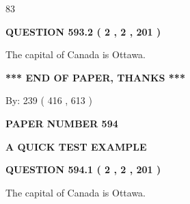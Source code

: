 \documentclass[12pt]{article}
\begin{document}
83
 
 
  
\vspace{0.2in}
  
{\textbf{\Large{QUESTION
593.2 
 ( 2 , 2 , 201 )
}}}
  
  
 
 
\noindent{}
 
 
The capital of Canada is Ottawa.
 
 
 
 
   
   
 \vspace{0.2in}
 
   
   
   
   
\vspace{1.0in} 
{\textbf{\large{ *** END OF PAPER, THANKS *** }}} 
   
   
\hspace{1.0in} By: 
 239 ( 416 ,  613 )
   
   
   
   
\newpage 
\setcounter{page}{ 
   594001 } 
   
   
   
   
 {\textbf{ \Large{ PAPER NUMBER  594  }}}
   
   
\vspace{0.2in}
   
   
   
   
   
   
 \vspace{0.2in}
{\LARGE {\textbf{ A QUICK TEST EXAMPLE}}}
   
   
  
\vspace{0.2in}
  
{\textbf{\Large{QUESTION
594.1 
 ( 2 , 2 , 201 )
}}}
  
  
 
 
\noindent{}
 
 
The capital of Canada is Ottawa.
 
 
 
 
  
\vspace{0.2in}
  
\end{document}
